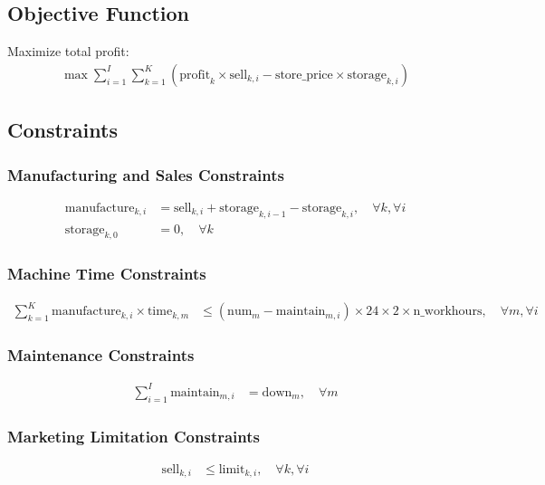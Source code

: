 \documentclass{article}
\begin{document}
\subsection*{Objective Function}
Maximize total profit:
\begin{align*}
    \max \sum_{i=1}^{I} \sum_{k=1}^{K} \left( \text{profit}_{k} \times \text{sell}_{k,i} - \text{store\_price} \times \text{storage}_{k,i} \right)
\end{align*}

\subsection*{Constraints}

\subsubsection*{Manufacturing and Sales Constraints}
\begin{align*}
    \text{manufacture}_{k,i} &= \text{sell}_{k,i} + \text{storage}_{k,i-1} - \text{storage}_{k,i}, \quad \forall k, \forall i \\
    \text{storage}_{k,0} &= 0, \quad \forall k
\end{align*}

\subsubsection*{Machine Time Constraints}
\begin{align*}
    \sum_{k=1}^{K} \text{manufacture}_{k,i} \times \text{time}_{k,m} &\leq \left( \text{num}_{m} - \text{maintain}_{m,i} \right) \times 24 \times 2 \times \text{n\_workhours}, \quad \forall m, \forall i
\end{align*}

\subsubsection*{Maintenance Constraints}
\begin{align*}
    \sum_{i=1}^{I} \text{maintain}_{m,i} &= \text{down}_{m}, \quad \forall m
\end{align*}

\subsubsection*{Marketing Limitation Constraints}
\begin{align*}
    \text{sell}_{k,i} &\leq \text{limit}_{k,i}, \quad \forall k, \forall i
\end{align*}
\end{document}
